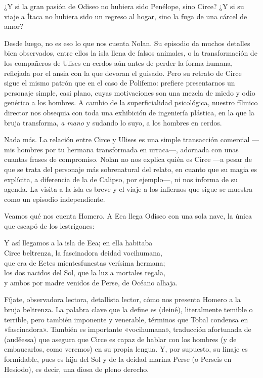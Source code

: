 \label{cap:circe}

¿Y si la gran pasión de Odiseo no hubiera sido Penélope, sino Circe? ¿Y si su viaje a Ítaca no hubiera sido un regreso al hogar, sino la fuga de una cárcel de amor?

Desde luego, no es eso lo que nos cuenta Nolan. Su episodio da muchos detalles bien observados, entre ellos la isla llena de falsos animales, o la transformación de los compañeros de Ulises en cerdos aún antes de perder la forma humana, reflejada por el ansia con la que devoran el guisado. Pero su retrato de Circe sigue el mismo patrón que en el caso de Polifemo: prefiere presentarnos un personaje simple, casi plano, cuyas motivaciones son una mezcla de miedo y odio genérico a los hombres. A cambio de la superficialidad psicológica, nuestro fílmico director nos obsequia con toda una exhibición de ingeniería plástica, en la que la bruja transforma, \emph{a mano} y sudando lo suyo, a los hombres en cerdos.

Nada más. La relación entre Circe y Ulises es una simple transacción comercial ---mis hombres por tu hermana transformada en urraca---, adornada con unas cuantas frases de compromiso. Nolan no nos explica quién es Circe ---a pesar de que se trata del personaje más sobrenatural del relato, en cuanto que su magia es explícita, a diferencia de la de Calipso, por ejemplo---, ni nos informa de su agenda. La visita a la isla es breve y el viaje a los infiernos que sigue se muestra como un episodio independiente.

Veamos qué nos cuenta Homero. A Eea llega Odiseo con una sola nave, la única que escapó de los lestrigones:

\begin{versocita}
Y así llegamos a la isla de Eea; en ella habitaba\\
Circe beltrenza, la fascinadora deidad vocihumana,\\
que era de Eetes mientesfunestas verísima hermana;\\
los dos nacidos del Sol, que la luz a mortales regala,\\
y ambos por madre venidos de Perse, de Océano alhaja.
\end{versocita}

Fíjate, observadora lectora, detallista lector, cómo nos presenta Homero a la bruja beltrenza. La palabra clave que la define es  (deinḗ), literalmente temible o terrible, pero también imponente y venerable, términos que Tobal condensa en «fascinadora». También es importante «vocihumana», traducción afortunada de  (audḗessa) que asegura que Circe es capaz de hablar con los hombres (y de embaucarlos, como veremos) en su propia lengua. Y, por supuesto, su linaje es formidable, pues es hija del Sol y de la deidad marina Perse (o Perseis en Hesíodo), es decir, una diosa de pleno derecho.

